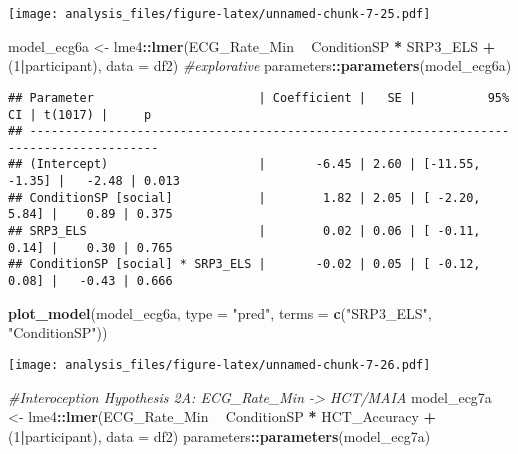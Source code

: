 \documentclass[
]{article}
\newenvironment{Shaded}{\begin{snugshade}}{\end{snugshade}}
\newcommand{\CommentTok}[1]{\textcolor[rgb]{0.56,0.35,0.01}{\textit{#1}}}
\newcommand{\DataTypeTok}[1]{\textcolor[rgb]{0.13,0.29,0.53}{#1}}
\newcommand{\DecValTok}[1]{\textcolor[rgb]{0.00,0.00,0.81}{#1}}
\newcommand{\KeywordTok}[1]{\textcolor[rgb]{0.13,0.29,0.53}{\textbf{#1}}}
\newcommand{\NormalTok}[1]{#1}
\newcommand{\OperatorTok}[1]{\textcolor[rgb]{0.81,0.36,0.00}{\textbf{#1}}}
\newcommand{\StringTok}[1]{\textcolor[rgb]{0.31,0.60,0.02}{#1}}
\begin{document}
\texttt{[image: analysis\_files/figure-latex/unnamed-chunk-7-25.pdf]}

\begin{Shaded}
\begin{Highlighting}[]
\NormalTok{model_ecg6a <-}\StringTok{ }\NormalTok{lme4}\OperatorTok{::}\KeywordTok{lmer}\NormalTok{(ECG_Rate_Min }\OperatorTok{~}\StringTok{ }\NormalTok{ConditionSP }\OperatorTok{*}\StringTok{ }\NormalTok{SRP3_ELS }\OperatorTok{+}\StringTok{ }\NormalTok{(}\DecValTok{1}\OperatorTok{|}\NormalTok{participant), }\DataTypeTok{data =}\NormalTok{ df2)  }\CommentTok{#explorative}
\NormalTok{parameters}\OperatorTok{::}\KeywordTok{parameters}\NormalTok{(model_ecg6a)}
\end{Highlighting}
\end{Shaded}

\begin{verbatim}
## Parameter                       | Coefficient |   SE |          95% CI | t(1017) |     p
## ----------------------------------------------------------------------------------------
## (Intercept)                     |       -6.45 | 2.60 | [-11.55, -1.35] |   -2.48 | 0.013
## ConditionSP [social]            |        1.82 | 2.05 | [ -2.20,  5.84] |    0.89 | 0.375
## SRP3_ELS                        |        0.02 | 0.06 | [ -0.11,  0.14] |    0.30 | 0.765
## ConditionSP [social] * SRP3_ELS |       -0.02 | 0.05 | [ -0.12,  0.08] |   -0.43 | 0.666
\end{verbatim}

\begin{Shaded}
\begin{Highlighting}[]
\KeywordTok{plot_model}\NormalTok{(model_ecg6a, }\DataTypeTok{type =} \StringTok{"pred"}\NormalTok{, }\DataTypeTok{terms =} \KeywordTok{c}\NormalTok{(}\StringTok{"SRP3_ELS"}\NormalTok{, }\StringTok{"ConditionSP"}\NormalTok{))}
\end{Highlighting}
\end{Shaded}

\texttt{[image: analysis\_files/figure-latex/unnamed-chunk-7-26.pdf]}

\begin{Shaded}
\begin{Highlighting}[]
\CommentTok{#Interoception Hypothesis 2A: ECG_Rate_Min -> HCT/MAIA}
\NormalTok{model_ecg7a <-}\StringTok{ }\NormalTok{lme4}\OperatorTok{::}\KeywordTok{lmer}\NormalTok{(ECG_Rate_Min }\OperatorTok{~}\StringTok{ }\NormalTok{ConditionSP }\OperatorTok{*}\StringTok{ }\NormalTok{HCT_Accuracy }\OperatorTok{+}\StringTok{ }\NormalTok{(}\DecValTok{1}\OperatorTok{|}\NormalTok{participant), }\DataTypeTok{data =}\NormalTok{ df2)}
\NormalTok{parameters}\OperatorTok{::}\KeywordTok{parameters}\NormalTok{(model_ecg7a)}
\end{Highlighting}
\end{Shaded}
\end{document}
